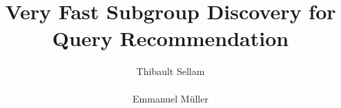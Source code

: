\documentclass{acm_proc_article-sp}
\begin{document}
\title{Very Fast Subgroup Discovery for Query Recommendation}

\author{
\alignauthor
Thibault Sellam\\
       \\
\alignauthor
Emmanuel M\"uller\\
       \\
}

\maketitle









  
\balancecolumns
\end{document}
